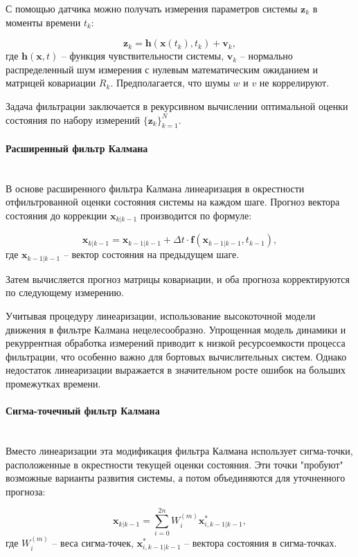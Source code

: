 С помощью датчика можно получать измерения параметров системы $\mathbf{z}_k$ в моменты времени $t_k$:

\begin{equation*}
    \mathbf{z}_k = \mathbf{h} (\mathbf{x}(t_k), t_k) + \mathbf{v}_k,
\end{equation*}
где $\mathbf{h} (\mathbf{x}, t)$ -- функция чувствительности системы, $\mathbf{v}_k$ --
нормально распределенный шум измерения с нулевым математическим ожиданием и матрицей
ковариации $R_k$. Предполагается, что шумы $w$ и $v$ не коррелируют.

Задача фильтрации заключается в рекурсивном вычислении оптимальной оценки состояния
по набору измерений $\{\mathbf{z}_k\}_{k=1}^N$. 

\paragraph{Расширенный фильтр Калмана} \mbox{} \\

В основе расширенного фильтра Калмана линеаризация в окрестности отфильтрованной
оценки состояния системы на каждом шаге. Прогноз вектора состояния до коррекции $\mathbf{x}_{k|k-1}$
производится по формуле:

\begin{equation*}
    \mathbf{x}_{k|k-1} = \mathbf{x}_{k-1|k-1} 
    + \Delta t \cdot \mathbf{f} (\mathbf{x}_{k-1|k-1}, t_{k-1}),
\end{equation*}
где $\mathbf{x}_{k-1|k-1}$ -- вектор состояния на предыдущем шаге.

Затем вычисляется прогноз матрицы ковариации, и оба прогноза корректируются по 
следующему измерению.

Учитывая процедуру линеаризации, использование высокоточной модели движения в
фильтре Калмана нецелесообразно. Упрощенная модель динамики и рекуррентная обработка
измерений приводит к низкой ресурсоемкости процесса фильтрации, что особенно важно
для бортовых вычислительных систем. Однако недостаток линеаризации выражается в значительном
росте ошибок на больших промежутках времени.

\paragraph{Сигма-точечный фильтр Калмана} \mbox{} \\

Вместо линеаризации эта модификация фильтра Калмана использует сигма-точки,
расположенные в окрестности текущей оценки состояния. Эти точки "пробуют" возможные
варианты развития системы, а потом объединяются для уточненного прогноза:

\begin{equation*}
    \mathbf{x}_{k|k-1} = \sum_{i = 0}^{2n} W_i^{(m)} \mathbf{x}^{*}_{i, k-1|k-1},
\end{equation*}
где $W_i^{(m)}$ -- веса сигма-точек, $\mathbf{x}^{*}_{i, k-1|k-1}$ -- вектора состояния в сигма-точках.